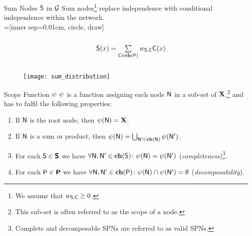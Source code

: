 \begin{frame}{Sum Nodes $\mathsf{S}$ in $\mathcal{G}$}
Sum nodes\footnote{\scriptsize We assume that $w_{\mathsf{S}, \mathsf{C}} \geq 0$.} replace independence with conditional independence within the network.\\[1em]

=[inner sep=0.01cm, circle, draw]
\begin{columns}
\begin{column}{.2\linewidth}
\end{column}
\begin{column}{.2\linewidth}
\end{column}
\begin{column}{.4\linewidth}
$\mathsf{S}(x)  = \sum\limits_{\mathsf{C} \in \mathbf{ch}(\mathsf{P})}  w_{\mathsf{S}, \mathsf{C}}\mathsf{C}(x)$
\end{column}
\begin{column}{.2\linewidth}
\end{column}
\end{columns}

\centering
\begin{figure}
\texttt{[image: sum\_distribution]}
\end{figure}
\end{frame}

\begin{frame}{Scope Function $\psi$}
$\psi$ is a function assigning each node $\mathsf{N}$ in a sub-set of $\mathbf{X}$,\footnote{\scriptsize This sub-set is often referred to as the scope of a node.} and has to fulfil the following properties:
\begin{defbox}
\begin{enumerate}
\item If $\mathsf{N}$ is the root node, then $\psi(\mathsf{N}) = \mathbf{X}$.
\item If $\mathsf{N}$ is a sum or product, then $\psi(\mathsf{N}) = \bigcup_{\mathsf{N}' \in \mathbf{ch}(\mathsf{N})} \psi(\mathsf{N}')$.
\item For each $\mathsf{S} \in \bm{\mathsf{S}}$ we have $\forall \mathsf{N}, \mathsf{N}' \in \mathbf{ch}(\mathsf{S})\colon \psi(\mathsf{N}) = \psi(\mathsf{N}')$ (\emph{completeness})\footnote{\scriptsize Complete and decomposable SPNs are referred to as valid SPNs.}.
\item For each $\mathsf{P} \in \bm{\mathsf{P}}$ we have $\forall \mathsf{N}, \mathsf{N}' \in \mathbf{ch}(\mathsf{P})\colon \psi(\mathsf{N}) \cap \psi(\mathsf{N}') = \emptyset$ (\emph{decomposability}).
\end{enumerate}
\end{defbox}
\end{frame}

